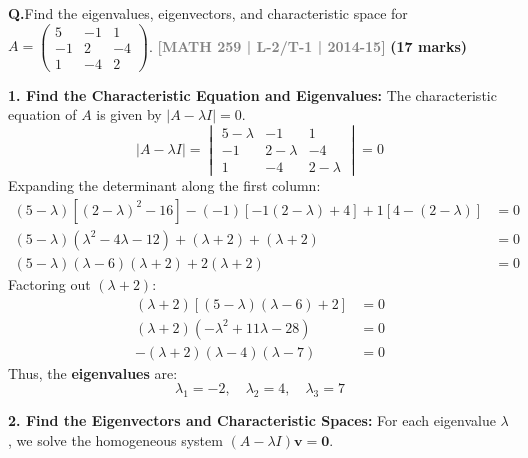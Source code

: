 \documentclass[12pt,a3paper]{article}
\newcommand{\yr}[1]{\hfill\textcolor{gray}{\small\textbf{[#1]}}}
\newcommand{\mk}[1]{\textcolor{orange!70!black}{\small\textbf{(#1 marks)}}}
\newcounter{qnum}
\newcommand{\Q}[1]{%
  \needspace{4\baselineskip}
  \refstepcounter{qnum}
  \vspace{6pt}
  \noindent\textbf{Q\theqnum.}\enspace #1\par
}
\begin{document}
\Q{Find the eigenvalues, eigenvectors, and characteristic space for $A = \begin{pmatrix} 5 & -1 & 1 \\ -1 & 2 & -4 \\ 1 & -4 & 2 \end{pmatrix}$.
\yr{MATH 259 | L-2/T-1 | 2014-15} \mk{17}}
\begin{tcolorbox}[enhanced,breakable,
  colback=cE!4,colframe=cE,boxrule=0.8pt,arc=5pt,
  title={\textbf{Answer --- Eigenvalues, Eigenvectors, and Characteristic Space}},
  fonttitle=\bfseries\color{white},colbacktitle=cE]

\textbf{1. Find the Characteristic Equation and Eigenvalues:}
The characteristic equation of $A$ is given by $|A - \lambda I| = 0$.
\[
|A - \lambda I| = \begin{vmatrix} 
5-\lambda & -1 & 1 \\ 
-1 & 2-\lambda & -4 \\ 
1 & -4 & 2-\lambda 
\end{vmatrix} = 0
\]
Expanding the determinant along the first column:
\begin{align*}
(5-\lambda)[(2-\lambda)^2 - 16] - (-1)[-1(2-\lambda) + 4] + 1[4 - (2-\lambda)] &= 0 \\
(5-\lambda)(\lambda^2 - 4\lambda - 12) + (\lambda + 2) + (\lambda + 2) &= 0 \\
(5-\lambda)(\lambda - 6)(\lambda + 2) + 2(\lambda + 2) &= 0 
\end{align*}
Factoring out $(\lambda + 2)$:
\begin{align*}
(\lambda + 2) [ (5-\lambda)(\lambda - 6) + 2 ] &= 0 \\
(\lambda + 2) ( -\lambda^2 + 11\lambda - 28 ) &= 0 \\
-(\lambda + 2) (\lambda - 4)(\lambda - 7) &= 0
\end{align*}
Thus, the \textbf{eigenvalues} are:
\[
\boxed{\lambda_1 = -2, \quad \lambda_2 = 4, \quad \lambda_3 = 7}
\]

\vspace{0.3cm}
\textbf{2. Find the Eigenvectors and Characteristic Spaces:}
For each eigenvalue $\lambda$, we solve the homogeneous system $(A - \lambda I)\mathbf{v} = \mathbf{0}$.


\end{tcolorbox}
\end{document}
